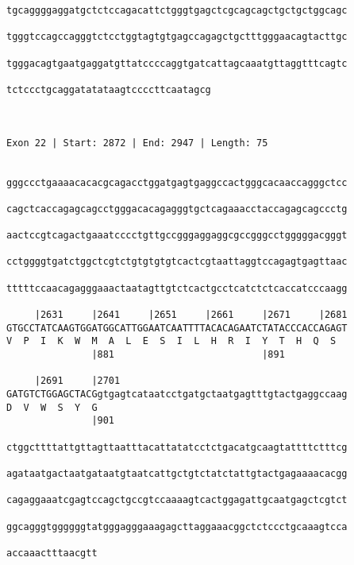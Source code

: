 \documentclass{article}
\begin{document}
\begin{Verbatim}
tgcaggggaggatgctctccagacattctgggtgagctcgcagcagctgctgctggcagc
                                                            
tgggtccagccagggtctcctggtagtgtgagccagagctgctttgggaacagtacttgc
                                                            
tgggacagtgaatgaggatgttatccccaggtgatcattagcaaatgttaggtttcagtc
                                                            
tctccctgcaggatatataagtccccttcaatagcg
                                    
                                    
 
Exon 22 | Start: 2872 | End: 2947 | Length: 75


gggccctgaaaacacacgcagacctggatgagtgaggccactgggcacaaccagggctcc
                                                            
cagctcaccagagcagcctgggacacagagggtgctcagaaacctaccagagcagccctg
                                                            
aactccgtcagactgaaatcccctgttgccgggaggaggcgccgggcctgggggacgggt
                                                            
cctggggtgatctggctcgtctgtgtgtgtcactcgtaattaggtccagagtgagttaac
                                                            
tttttccaacagagggaaactaatagttgtctcactgcctcatctctcaccatcccaagg
                                                            
     |2631     |2641     |2651     |2661     |2671     |2681
GTGCCTATCAAGTGGATGGCATTGGAATCAATTTTACACAGAATCTATACCCACCAGAGT
V  P  I  K  W  M  A  L  E  S  I  L  H  R  I  Y  T  H  Q  S  
               |881                          |891           
  
     |2691     |2701                                        
GATGTCTGGAGCTACGgtgagtcataatcctgatgctaatgagtttgtactgaggccaag
D  V  W  S  Y  G                                            
               |901
  
ctggcttttattgttagttaatttacattatatcctctgacatgcaagtattttctttcg

agataatgactaatgataatgtaatcattgctgtctatctattgtactgagaaaacacgg

cagaggaaatcgagtccagctgccgtccaaaagtcactggagattgcaatgagctcgtct

ggcagggtggggggtatgggagggaaagagcttaggaaacggctctccctgcaaagtcca

accaaactttaacgtt
                


\end{Verbatim}
\end{document}
